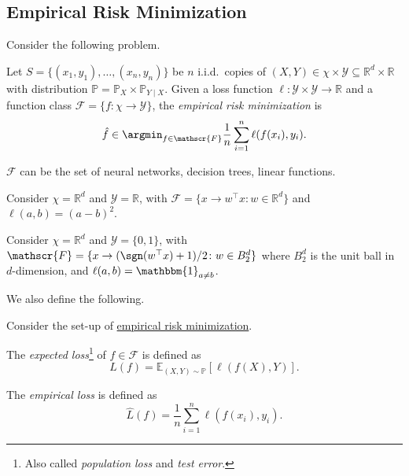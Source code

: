 \subsection{Empirical Risk Minimization}
Consider the following problem.

\begin{problem}\label{prb:ERM}
Let \(S = \{ (x_1, y_1) , \dots , (x_n, y_n)\} \) be \(n\) i.i.d.\ copies of \((X, Y) \in \chi \times \mathcal{Y} \subseteq \mathbb{R} ^d\times \mathbb{R}\) with distribution \(\mathbb{P} = \mathbb{P} _X \times \mathbb{P} _{Y \mid X}\). Given a loss function \(\ell \colon \mathcal{Y} \times \mathcal{Y} \to \mathbb{R}\) and a function class \(\mathscr{F} = \{ f\colon \chi \to \mathcal{Y}  \} \), the \emph{empirical risk minimization} is
\[
	\hat{f} \in \argmin_{f\in \mathscr{F} } \frac{1}{n}\sum_{i=1}^{n} \ell (f(x_i), y_i).
\]
\end{problem}

\begin{eg}
	\(\mathscr{F} \) can be the set of neural networks, decision trees, linear functions.
\end{eg}

\begin{eg}
	Consider \(\chi = \mathbb{R} ^d\) and \(\mathcal{Y} = \mathbb{R} \), with \(\mathscr{F} = \{ x \to w^{\top} x \colon w\in \mathbb{R} ^d \} \) and \(\ell (a, b) = (a - b)^2\).
\end{eg}

\begin{eg}
	Consider \(\chi = \mathbb{R} ^d\) and \(\mathcal{Y} = \{ 0, 1 \} \), with \(\mathscr{F} = \{ x \to (\sgn (w^{\top} x ) + 1)/ 2 \colon w\in B_2^d \}\) where \(B_2^d\) is the unit ball in \(d\)-dimension, and \(\ell (a, b) = \mathbbm{1}_{a \neq b} \).
\end{eg}

We also define the following.

\begin{definition*}
	Consider the set-up of \hyperref[prb:ERM]{empirical risk minimization}.
	\begin{definition}\label{def:expected-loss}
		The \emph{expected loss}\footnote{Also called \emph{population loss} and \emph{test error}.} of \(f\in \mathscr{F} \) is defined as
		\[
			L(f) = \mathbb{E}_{(X, Y) \sim \mathbb{P} }\left[\ell (f(X), Y) \right].
		\]
	\end{definition}

	\begin{definition}\label{def:empirical-loss}
		The \emph{empirical loss} is defined as
		\[
			\hat{L} (f) = \frac{1}{n}\sum_{i=1}^{n} \ell (f(x_i), y_i).
		\]
	\end{definition}
\end{definition*}

